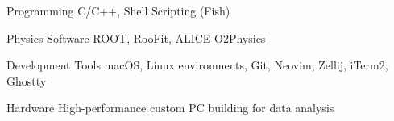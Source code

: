 

\begin{cvskills}

  \cvskill
    {Programming} %
    {C/C++, Shell Scripting (Fish)} %
    {} %

  \cvskill
    {Physics Software} %
    {ROOT, RooFit, ALICE O2Physics} %
    {} %

  \cvskill
    {Development Tools} %
    {macOS, Linux environments, Git, Neovim, Zellij, iTerm2, Ghostty} %
    {} %

  \cvskill
    {Hardware} %
    {High-performance custom PC building for data analysis} %
    {} %

\end{cvskills}